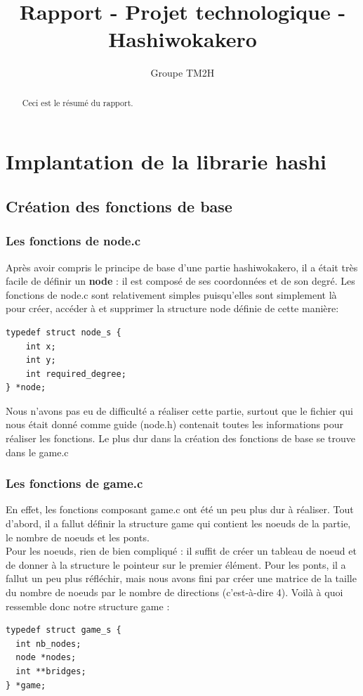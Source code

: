 \documentclass[12pt]{report}
\title{Rapport - Projet technologique - Hashiwokakero}
\author{Groupe TM2H}
\begin{document}
\maketitle

\begin{abstract}
Ceci est le résumé du rapport.
\end{abstract}

\tableofcontents

\chapter{Implantation de la librarie hashi}

\section{Création des fonctions de base}

\subsection{Les fonctions de node.c}
\textnormal{Après avoir compris le principe de base d'une partie hashiwokakero, il a était très facile de définir un \textbf{node} : il est composé de ses coordonnées et de son degré. Les fonctions de node.c sont relativement simples puisqu'elles sont simplement là pour créer, accéder à et supprimer la structure node définie de cette manière:}
\begin{verbatim}
typedef struct node_s {
	int x;
	int y;
	int required_degree;
} *node;
\end{verbatim}

\textnormal{Nous n'avons pas eu de difficulté a réaliser cette partie, surtout que le fichier qui nous était donné comme guide (node.h) contenait toutes les informations pour réaliser les fonctions. Le plus dur dans la création des fonctions de base se trouve dans le game.c}
\subsection{Les fonctions de game.c}
\textnormal{En effet, les fonctions composant game.c ont été un peu plus dur à réaliser. Tout d'abord, il a fallut définir la structure game qui contient les noeuds de la partie, le nombre de noeuds et les ponts.\\ Pour les noeuds, rien de bien compliqué : il suffit de créer un tableau de noeud et de donner à la structure le pointeur sur le premier élément. Pour les ponts, il a fallut un peu plus réfléchir, mais nous avons fini par créer une matrice de la taille du nombre de noeuds par le nombre de directions (c'est-à-dire 4). Voilà à quoi ressemble donc notre structure game :}
\begin{verbatim}
typedef struct game_s {
  int nb_nodes;
  node *nodes; 
  int **bridges;
} *game;
\end{verbatim}
\end{document}
